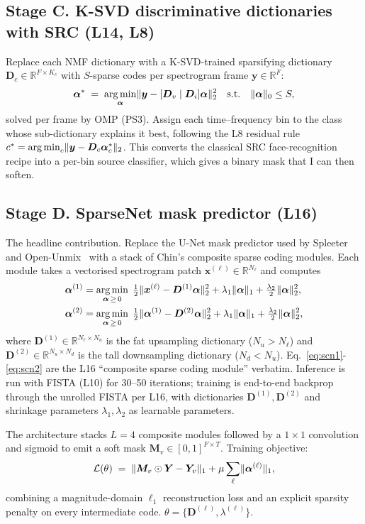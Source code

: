 \documentclass[11pt]{article}
\DeclarePairedDelimiter{\norm}{\lVert}{\rVert}
\DeclareMathOperator*{\argmin}{arg\,min}
\newcommand{\R}{\mathbb{R}}
\newcommand{\D}{\bm{D}}
\newcommand{\xb}{\bm{x}}
\newcommand{\yb}{\bm{y}}
\newcommand{\alphab}{\bm{\alpha}}
\newcommand{\Mb}{\bm{M}}
\begin{document}
\subsection*{Stage C. K-SVD discriminative dictionaries with SRC (L14, L8)}
Replace each NMF dictionary with a K-SVD-trained sparsifying dictionary
$\D_c\in\R^{F\times K_c}$ with $S$-sparse codes per spectrogram frame
$\yb\in\R^F$:
\[
\alphab^* \;=\; \argmin_{\alphab} \norm{\yb - [\D_v \mid \D_i]\alphab}_2^2
\quad\text{s.t.}\quad \norm{\alphab}_0 \le S,
\]
solved per frame by OMP (PS3).  Assign each time--frequency bin to the
class whose sub-dictionary explains it best, following the L8 residual rule
$c^* = \argmin_c \norm{\yb - \D_c \alphab^*_c}_2$.  This converts the
classical SRC face-recognition recipe into a per-bin source classifier,
which gives a binary mask that I can then soften.

\subsection*{Stage D. SparseNet mask predictor (L16)}
The headline contribution.  Replace the U-Net mask predictor used by Spleeter
and Open-Unmix~\cite{spleeter, openunmix} with a stack of Chin's composite
sparse coding modules.  Each module takes a vectorised spectrogram patch
$\xb^{(\ell)} \in \R^{N_\ell}$ and computes
\begin{align}
\alphab^{(1)} &= \argmin_{\alphab\,\ge\,0}\;
\tfrac{1}{2}\norm{\xb^{(\ell)} - \D^{(1)}\alphab}_2^2
+ \lambda_1\norm{\alphab}_1
+ \tfrac{\lambda_2}{2}\norm{\alphab}_2^2,
\label{eq:scn1}\\
\alphab^{(2)} &= \argmin_{\alphab\,\ge\,0}\;
\tfrac{1}{2}\norm{\alphab^{(1)} - \D^{(2)}\alphab}_2^2
+ \lambda_1\norm{\alphab}_1
+ \tfrac{\lambda_2}{2}\norm{\alphab}_2^2,
\label{eq:scn2}
\end{align}
where $\D^{(1)}\in\R^{N_\ell\times N_u}$ is the fat upsampling dictionary
($N_u > N_\ell$) and $\D^{(2)}\in\R^{N_u\times N_d}$ is the tall
downsampling dictionary ($N_d < N_u$).  Eq.~\eqref{eq:scn1}-\eqref{eq:scn2}
are the L16 ``composite sparse coding module'' verbatim.  Inference is run
with FISTA (L10) for 30--50 iterations; training is end-to-end backprop
through the unrolled FISTA per L16, with dictionaries $\D^{(1)},\D^{(2)}$
and shrinkage parameters $\lambda_1,\lambda_2$ as learnable parameters.

The architecture stacks $L\!=\!4$ composite modules followed by a
$1\!\times\!1$ convolution and sigmoid to emit a soft mask
$\Mb_v\in[0,1]^{F\times T}$.  Training objective:
\[
\mathcal{L}(\theta) \;=\; \norm{\Mb_v\odot\bm{Y} - \bm{Y}_v}_1
+ \mu \sum_\ell \norm{\alphab^{(\ell)}}_1,
\]
combining a magnitude-domain $\ell_1$ reconstruction loss and an explicit
sparsity penalty on every intermediate code.  $\theta = \{\D^{(\ell)},
\lambda^{(\ell)}\}$.
\end{document}
